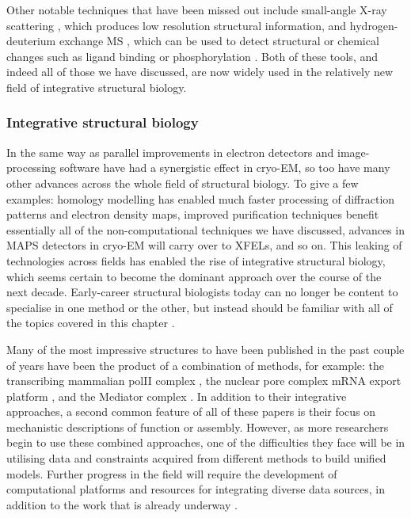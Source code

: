 \documentclass[a4paper,11pt,twoside,openright]{scrbook}
\begin{document}
Other notable techniques that have been missed out include small-angle X-ray scattering \cite{Mertens2010}, which produces low resolution structural information, and hydrogen-deuterium exchange MS \cite{Zhang2015b}, which can be used to detect structural or chemical changes such as ligand binding or phosphorylation \cite{Wang2009}. Both of these tools, and indeed all of those we have discussed, are now widely used in the relatively new field of integrative structural biology.

\subsubsection{Integrative structural biology}
In the same way as parallel improvements in electron detectors and image-processing software have had a synergistic effect in cryo-EM, so too have many other advances across the whole field of structural biology. To give a few examples: homology modelling has enabled much faster processing of diffraction patterns and electron density maps, improved purification techniques benefit essentially all of the non-computational techniques we have discussed, advances in MAPS detectors in cryo-EM will carry over to XFELs, and so on. This leaking of technologies across fields has enabled the rise of integrative structural biology, which seems certain to become the dominant approach over the course of the next decade. Early-career structural biologists today can no longer be content to specialise in one method or the other, but instead should be familiar with all of the topics covered in this chapter \cite{Shi2014,Cassiday2014}.

Many of the most impressive structures to have been published in the past couple of years have been the product of a combination of methods, for example: the transcribing mammalian polII complex \cite{Bernecky2016}, the nuclear pore complex mRNA export platform \cite{Fernandez-Martinez2016}, and the Mediator complex \cite{Tsai2017}. In addition to their integrative approaches, a second common feature of all of these papers is their focus on mechanistic descriptions of function or assembly. However, as more researchers begin to use these combined approaches, one of the difficulties they face will be in utilising data and constraints acquired from different methods to build unified models. Further progress in the field will require the development of computational platforms and resources for integrating diverse data sources, in addition to the work that is already underway \cite{Russel2012,Schneidman-Duhovny2014,Sali2015}.
\end{document}
